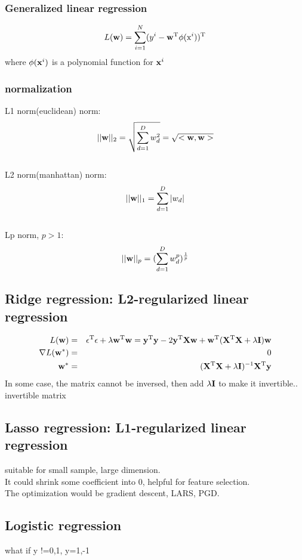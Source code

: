 \documentclass[12pt,a4paper]{article}
\begin{document}
\subsubsection*{Generalized linear regression}
$$
L({\bf w}) = \sum_{i=1}^{N}(y^i-{\bf w}^{\rm T}\phi({\rm x}^i))^{\rm T}
$$
where $\phi({\bf x}^i)$ is a polynomial function for ${\bf x}^i$
\subsubsection*{normalization}
L1 norm(euclidean) norm:
$$
||{\bf w}||_2 = \sqrt{\sum_{d=1}^{D}w_d^2}=\sqrt{<{\bf w},{\bf w}>}
$$\\
L2 norm(manhattan) norm:
$$
||{\bf w}||_1 = \sum_{d=1}^{D}|w_d|
$$\\
Lp norm, $p>1$:
$$
||{\bf w}||_p =(\sum_{d=1}^{D}w^p_d)^{\frac{1}{p}} 
$$
\subsection*{Ridge regression: L2-regularized linear regression}
\begin{eqnarray*}
L({\bf w}) &=& {\bf \epsilon}^{\rm T}{\bf \epsilon}+\lambda{\bf w}^{\rm T}{\bf w}={\bf y}^{\rm T}{\bf y}-2{\bf y}^{\rm T}{\bf X}{\bf w}+{\bf w}^{\rm T}({\bf X}^{\rm T}{\bf X}+\lambda{\bf I}){\bf w} \\
\nabla L({\bf w}^*) &=& 0 \\
{\bf w}^* &=& ({\bf X}^{\rm T}{\bf X}+\lambda{\bf I})^{-1}{\bf X}^{\rm T}{\bf y}
\end{eqnarray*}
In some case, the matrix cannot be inversed, then add $\lambda {\bf I}$ to make it invertible..\\
invertible matrix
\subsection*{Lasso regression: L1-regularized linear regression}
suitable for small sample, large dimension.\\
It could shrink some coefficient into 0, helpful for feature selection.\\
The optimization would be gradient descent, LARS, PGD.

\subsection*{Logistic regression}
what if y !=0,1, y=1,-1
\end{document}
